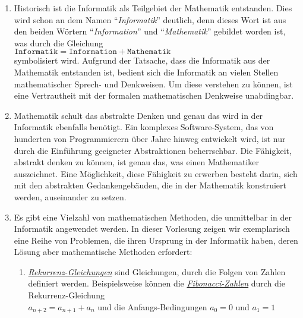 \begin{enumerate}
\item Historisch ist die Informatik als Teilgebiet der Mathematik entstanden.  Dies wird schon an
      dem Namen  ``\emph{Informatik}''  deutlich, denn dieses Wort ist aus den beiden W\"{o}rtern
      ``\emph{Information}'' und ``\emph{Mathematik}'' gebildet worden ist, was  
      durch die Gleichung 
      \\[0.2cm]
      \hspace*{1.3cm}
      \href{https://de.wikipedia.org/wiki/Informatik#Etymologie}{$\texttt{Informatik} = \texttt{Information} + \texttt{Mathematik}$}
      \\[0.2cm]
      symbolisiert wird.  Aufgrund der Tatsache, dass die Informatik aus der Mathematik entstanden
      ist, bedient sich die Informatik an vielen Stellen
      mathematischer Sprech- und Denkweisen.  Um diese verstehen zu k\"{o}nnen, ist eine 
      Vertrautheit mit der formalen mathematischen Denkweise unabdingbar.
\item Mathematik schult das abstrakte Denken und genau das wird in der Informatik ebenfalls
      ben\"{o}tigt.  Ein komplexes Software-System, das von hunderten von Programmierern \"{u}ber Jahre
      hinweg entwickelt wird, ist nur durch die Einf\"{u}hrung geeigneter Abstraktionen beherrschbar.
      Die F\"{a}higkeit, abstrakt denken zu k\"{o}nnen, ist genau das, was einen Mathematiker auszeichnet.
      Eine M\"{o}glichkeit,  diese F\"{a}higkeit zu erwerben besteht darin, sich mit den abstrakten
      Gedankengeb\"{a}uden, die in der Mathematik konstruiert werden, auseinander zu setzen.
\item Es gibt eine Vielzahl von mathematischen Methoden, die unmittelbar in der Informatik
      angewendet werden.  In dieser Vorlesung zeigen wir exemplarisch eine Reihe von Problemen, die
      ihren Ursprung in der Informatik haben, deren L\"{o}sung aber mathematische Methoden erfordert:
      \begin{enumerate}
      \item \href{https://en.wikipedia.org/wiki/Recurrence_relation}{\emph{Rekurrenz-Gleichungen}}
            sind Gleichungen, durch die Folgen von Zahlen definiert werden.  Beispielsweise k\"{o}nnen die
            \href{https://de.wikipedia.org/wiki/Fibonacci-Folge}{\emph{Fibonacci-Zahlen}} durch die
            Rekurrenz-Gleichung 
            \\[0.2cm]
            \hspace*{1.3cm}
            $a_{n+2} = a_{n+1} + a_n$  \quad und die Anfangs-Bedingungen $a_0 = 0$ und $a_1 = 1$

\end{enumerate}
\end{enumerate}
